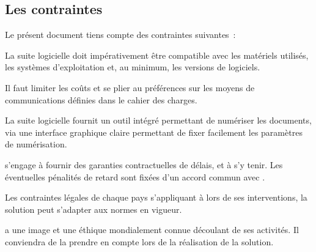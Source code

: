\subsection{Les contraintes}
Le présent document tiens compte des contraintes suivantes~:
\begin{constraint}
	La suite logicielle doit impérativement être compatible avec les matériels utilisés, les systèmes d'exploitation et, au minimum, les versions de logiciels.
\end{constraint}
\begin{constraint}
	Il faut limiter les coûts et se plier au préférences sur les moyens de communications définies dans le cahier des charges.
\end{constraint}
\begin{constraint}
	La suite logicielle fournit un outil intégré permettant de numériser les documents, via une interface graphique claire permettant de fixer facilement les paramètres de numérisation.
\end{constraint}
\begin{constraint}
	\amo s'engage à fournir des garanties contractuelles de délais, et à s'y tenir.
	Les éventuelles pénalités de retard sont fixées d'un accord commun avec \mo.
\end{constraint}
\begin{constraint}
	Les contraintes légales de chaque pays s'appliquant à \mo lors de ses interventions, la solution peut s'adapter aux normes en vigueur.
\end{constraint}
\begin{constraint}
	\mo a une image et une éthique mondialement connue découlant de ses activités.
	Il conviendra de la prendre en compte lors de la réalisation de la solution.
\end{constraint}
